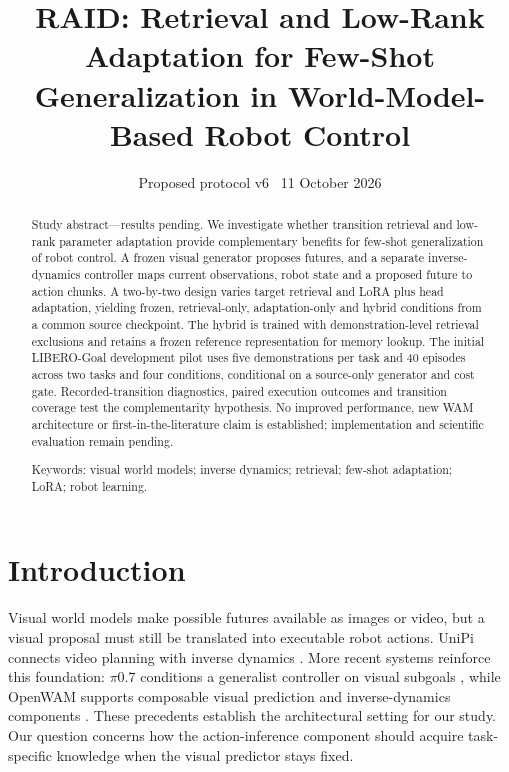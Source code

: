 \documentclass[11pt,a4paper]{article}
\title{\textbf{RAID: Retrieval and Low-Rank Adaptation for Few-Shot Generalization in World-Model-Based Robot Control}}
\author{}
\date{Proposed protocol v6 \textbar\ 11 October 2026}
\begin{document}
\maketitle

\begin{abstract}

Study abstract---results pending. We investigate whether transition retrieval and low-rank parameter adaptation provide complementary benefits for few-shot generalization of robot control. A frozen visual generator proposes futures, and a separate inverse-dynamics controller maps current observations, robot state and a proposed future to action chunks. A two-by-two design varies target retrieval and LoRA plus head adaptation, yielding frozen, retrieval-only, adaptation-only and hybrid conditions from a common source checkpoint. The hybrid is trained with demonstration-level retrieval exclusions and retains a frozen reference representation for memory lookup. The initial LIBERO-Goal development pilot uses five demonstrations per task and 40 episodes across two tasks and four conditions, conditional on a source-only generator and cost gate. Recorded-transition diagnostics, paired execution outcomes and transition coverage test the complementarity hypothesis. No improved performance, new WAM architecture or first-in-the-literature claim is established; implementation and scientific evaluation remain pending.

Keywords: visual world models; inverse dynamics; retrieval; few-shot adaptation; LoRA; robot learning.

\end{abstract}

\section{Introduction}

Visual world models make possible futures available as images or video, but a visual proposal must still be translated into executable robot actions. UniPi connects video planning with inverse dynamics \cite{ref2}. More recent systems reinforce this foundation: \(\pi\)0.7 conditions a generalist controller on visual subgoals \cite{ref30}, while OpenWAM supports composable visual prediction and inverse-dynamics components \cite{ref31}. These precedents establish the architectural setting for our study. Our question concerns how the action-inference component should acquire task-specific knowledge when the visual predictor stays fixed.
\end{document}
